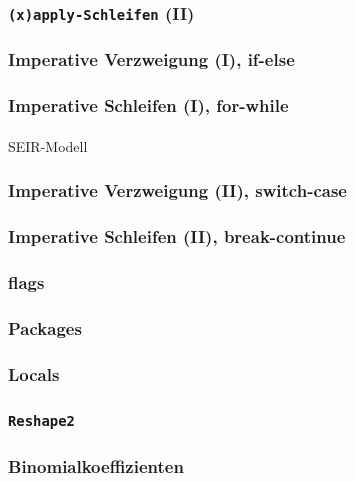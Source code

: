 \documentclass[paper=A4, pagesize, DIV=calc, smallheadings,
fontsize=11pt, expansion=false]{scrreprt}
\begin{document}
\subsubsection*{\texttt{(x)apply-Schleifen} (II)}

\subsubsection*{Imperative Verzweigung (I), if-else}

\subsubsection*{Imperative Schleifen (I), for-while}

\paragraph{}
SEIR-Modell

\subsubsection*{Imperative Verzweigung (II), switch-case}

\subsubsection*{Imperative Schleifen (II), break-continue}

\subsubsection*{flags}

\subsubsection*{Packages}

\subsubsection*{Locals}

\subsubsection*{\texttt{Reshape2}}

\subsubsection*{Binomialkoeffizienten}
\end{document}

